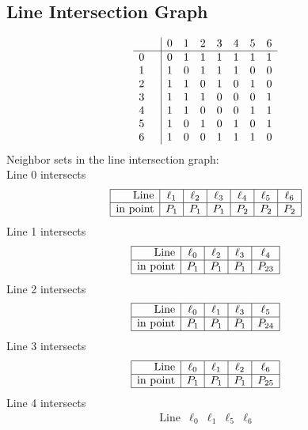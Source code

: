 \documentclass{article}
\begin{document}
{\subsection*{Line Intersection Graph}
{\arraycolsep=1pt
$$
\begin{array}{rr|*{7}r}
 &  & 0 & 1 & 2 & 3 & 4 & 5 & 6\\
\hline
0 &  & 0 & 1 & 1 & 1 & 1 & 1 & 1\\
1 &  & 1 & 0 & 1 & 1 & 1 & 0 & 0\\
2 &  & 1 & 1 & 0 & 1 & 0 & 1 & 0\\
3 &  & 1 & 1 & 1 & 0 & 0 & 0 & 1\\
4 &  & 1 & 1 & 0 & 0 & 0 & 1 & 1\\
5 &  & 1 & 0 & 1 & 0 & 1 & 0 & 1\\
6 &  & 1 & 0 & 0 & 1 & 1 & 1 & 0\\
\end{array}
$$
}%
Neighbor sets in the line intersection graph:\\
Line 0 intersects 
$$
\begin{array}{|r*{6}{|c}|}
\hline
\mbox{Line}  & \ell_{1} & \ell_{2} & \ell_{3} & \ell_{4} & \ell_{5} & \ell_{6}\\
\hline
\mbox{in point}  & P_{1} & P_{1} & P_{1} & P_{2} & P_{2} & P_{2}\\
\hline
\end{array}
$$
Line 1 intersects 
$$
\begin{array}{|r*{4}{|c}|}
\hline
\mbox{Line}  & \ell_{0} & \ell_{2} & \ell_{3} & \ell_{4}\\
\hline
\mbox{in point}  & P_{1} & P_{1} & P_{1} & P_{23}\\
\hline
\end{array}
$$
Line 2 intersects 
$$
\begin{array}{|r*{4}{|c}|}
\hline
\mbox{Line}  & \ell_{0} & \ell_{1} & \ell_{3} & \ell_{5}\\
\hline
\mbox{in point}  & P_{1} & P_{1} & P_{1} & P_{24}\\
\hline
\end{array}
$$
Line 3 intersects 
$$
\begin{array}{|r*{4}{|c}|}
\hline
\mbox{Line}  & \ell_{0} & \ell_{1} & \ell_{2} & \ell_{6}\\
\hline
\mbox{in point}  & P_{1} & P_{1} & P_{1} & P_{25}\\
\hline
\end{array}
$$
Line 4 intersects 
$$
\begin{array}{|r*{4}{|c}|}
\hline
\mbox{Line}  & \ell_{0} & \ell_{1} & \ell_{5} & \ell_{6}\\

\end{array}$$}
\end{document}
